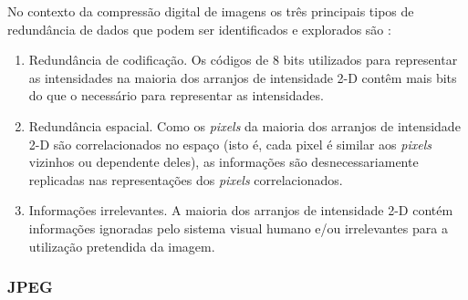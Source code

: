 No contexto da compressão digital de imagens os três principais tipos de redundância de dados que podem ser identificados e explorados são \cite{gonzalez2009processamento}:
\begin{enumerate}
	\item Redundância de codificação. Os códigos de 8 bits utilizados para representar as intensidades na maioria dos arranjos de intensidade	2-D contêm mais bits do que o necessário para representar as intensidades.
	\item Redundância espacial. Como os \textit{pixels} da
	maioria dos arranjos de intensidade 2-D são correlacionados no espaço (isto é, cada pixel é similar aos \textit{pixels} vizinhos ou dependente deles), as informações são desnecessariamente replicadas nas representações dos \textit{pixels} correlacionados.
	\item Informações irrelevantes. A maioria dos arranjos de intensidade 2-D contém informações ignoradas pelo sistema visual humano e/ou irrelevantes para a utilização pretendida da imagem. 
\end{enumerate}


\subsubsection{JPEG}

